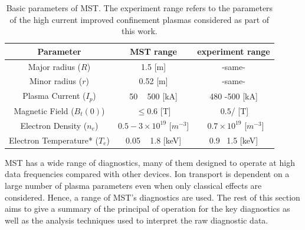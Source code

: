 \begin{table}[]
    \centering
    \begin{tabular}{||c|c|c||}
        Parameter & MST range & experiment range\\
        \hline
        Major radius ($R$)& 1.5 [m] & -same- \\
        Minor radius ($r$)& 0.52 [m] & -same- \\
        Plasma Current ($I_p$) & 50 ~ 500 [kA] & 480 -500 [kA] \\
        Magnetic Field ($B_t(0)$) & $\leq 0.6$ [T] & $~0.5$/ [T] \\
        Electron Density ($n_e$) & $0.5 - 3 \times 10^{19}$ [$m^{-3}$] & ~$0.7 \times 10^{19}$ [$m^{-3}$]\\
        Electron Temperature* ($T_e$) & 0.05 ~ 1.8 [keV] & 0.9 ~1.5 [keV] \\
        
    \end{tabular}
    \caption[MST parameters]{Basic parameters of MST. The experiment range refers to the parameters of the high current improved confinement plasmas considered as part of this work. }
    \label{tab:my_label}
\end{table}



MST has a wide range of diagnostics, many of them designed to operate at high data frequencies compared with %
other devices. Ion transport is dependent on a large number of plasma parameters even when only classical effects are considered. Hence, a range of MST's diagnostics are used. The rest of this section aims to give a summary of the principal of operation for the key diagnostics as well as the analysis techniques used to interpret %
the raw diagnostic data. 









